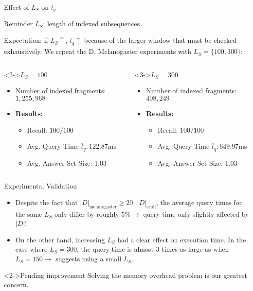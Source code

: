 \documentclass[9pt]{beamer}
\begin{document}
\begin{frame}{Effect of $L_S$ on $\overline{t}_q$}
	\begin{block}{Reminder}
		$L_S$: length of indexed subsequences
	\end{block}
	Expectation: if $L_S \uparrow $, $t_q \uparrow $ because of the larger window that must be checked exhaustively.
	We repeat the D. Melanogaster experiments with $L_S = \{ 100, 300 \}$:
	\begin{columns}
		\begin{column}{0.5 \textwidth}
			\begin{block}<2->{$L_S = 100$}
				\begin{itemize}
					\item Number of indexed fragments: $1,255,968$
					\item \textbf{Results:}
					\begin{itemize}
						\item Recall: $ 100 / 100 $
						\item Avg. Query Time $\overline{t}_q: 122.87 $ms
						\item Avg. Answer Set Size: 1.03
					\end{itemize}
				\end{itemize}
			\end{block}
		\end{column}
		\begin{column}{0.5 \textwidth}
			\begin{block}<3->{$L_S = 300$}
				\begin{itemize}
					\item Number of indexed fragments: $408,249$
					\item \textbf{Results:}
					\begin{itemize}
						\item Recall: $ 100 / 100 $
						\item Avg. Query Time $\overline{t}_q: 649.97 $ms
						\item Avg. Answer Set Size: 1.03
					\end{itemize}
				\end{itemize}
			\end{block}
		\end{column}
	\end{columns}
\end{frame}
\begin{frame}{Experimental Validation}
	\begin{itemize}
	\item Despite the fact that $|D|_{\text{melanogaster}} \geq 20 \cdot |D|_{\text{ecoli}}$, the average query times for the same $L_S$ only differ by roughly $5 \% \to $ query time only slightly affected by $|D|$!
	\item On the other hand, increasing $L_S$ had a clear effect on execution time. In the case where $L_S = 300$, the query time is almost 3 times as large as when $L_S = 150 \to $ suggests using a small $L_S$.
	\end{itemize}
	\begin{block}<2->{Pending improvement}
		Solving the memory overhead problem is our greatest concern.
	\end{block}
\end{frame}
\end{document}
